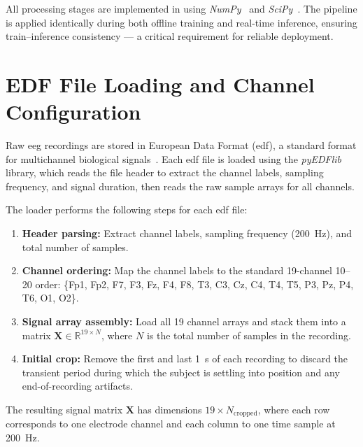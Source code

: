 All processing stages are implemented in 
using \textit{NumPy}~\cite{harris2020numpy} and
\textit{SciPy}~\cite{virtanen2020scipy}. The pipeline is
applied identically during both offline training and real-time
inference, ensuring train--inference consistency — a critical
requirement for reliable deployment.

\section{EDF File Loading and Channel Configuration}
\label{sec:sp_loading}

Raw \acrshort{eeg} recordings are stored in European Data Format
(\acrshort{edf}), a standard format for multichannel biological
signals~\cite{kemp1992edf}. Each \acrshort{edf} file is loaded
using the \textit{pyEDFlib} library, which reads the file header
to extract the channel labels, sampling frequency, and signal
duration, then reads the raw sample arrays for all channels.

The loader performs the following steps for each \acrshort{edf}
file:

\begin{enumerate}[leftmargin=*]
    \item \textbf{Header parsing:} Extract channel labels,
    sampling frequency (\SI{200}{\hertz}), and total number
    of samples.
    \item \textbf{Channel ordering:} Map the channel labels
    to the standard 19-channel 10--20 order:
    \{Fp1, Fp2, F7, F3, Fz, F4, F8, T3, C3, Cz, C4, T4,
    T5, P3, Pz, P4, T6, O1, O2\}.
    \item \textbf{Signal array assembly:} Load all 19 channel
    arrays and stack them into a matrix $\mathbf{X} \in
    \mathbb{R}^{19 \times N}$, where $N$ is the total number
    of samples in the recording.
    \item \textbf{Initial crop:} Remove the first and last
    \SI{1}{\second} of each recording to discard the
    transient period during which the subject is settling
    into position and any end-of-recording artifacts.
\end{enumerate}

The resulting signal matrix $\mathbf{X}$ has dimensions
$19 \times N_{\text{cropped}}$, where each row corresponds
to one electrode channel and each column to one time sample
at \SI{200}{\hertz}.

